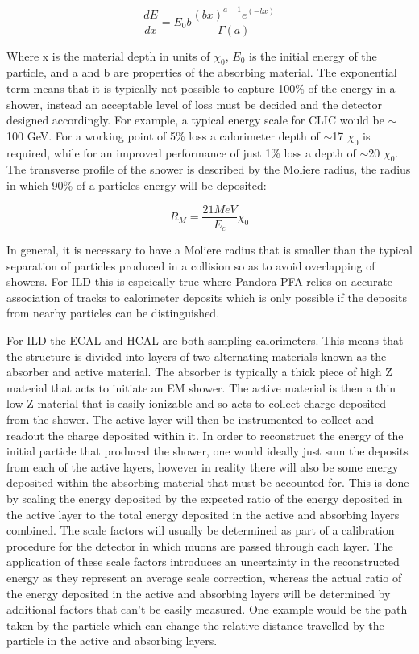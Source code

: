 \begin{equation}
  \label{bethebloch}
\frac{dE}{dx}=E_0 b \frac{(bx)^{a-1}e^(-bx)}{\Gamma(a)}
\end{equation}

Where x is the material depth in units of $\chi_0$, $E_0$ is the initial energy of the particle, and a and b are properties of the absorbing material. The exponential term means that it is typically not possible to capture 100\% of the energy in a shower, instead an acceptable level of loss must be decided and the detector designed accordingly. For example, a typical energy scale for \ac{CLIC} would be $\sim$ 100 GeV. For a working point of 5\% loss a calorimeter depth of $\sim$17 $\chi_0$ is required, while for an improved performance of just 1\% loss a depth of $\sim$20 $\chi_0$. The transverse profile of the shower is described by the Moliere radius, the radius in which 90\% of a particles energy will be deposited:

\begin{equation}
R_M=\frac{21MeV}{E_c}\chi_0
\end{equation}

In general, it is necessary to have a Moliere radius that is smaller than the typical separation of particles produced in a collision so as to avoid overlapping of showers. For \ac{ILD} this is espeically true where Pandora \ac{PFA} relies on accurate association of tracks to calorimeter deposits which is only possible if the deposits from nearby particles can be distinguished.

For \ac{ILD} the \ac{ECAL} and \ac{HCAL} are both sampling calorimeters. This means that the structure is divided into layers of two alternating materials known as the absorber and active material. The absorber is typically a thick piece of high Z material that acts to initiate an \ac{EM} shower. The active material is then a thin low Z material that is easily ionizable and so acts to collect charge deposited from the shower. The active layer will then be instrumented to collect and readout the charge deposited within it. In order to reconstruct the energy of the initial particle that produced the shower, one would ideally just sum the deposits from each of the active layers, however in reality there will also be some energy deposited within the absorbing material that must be accounted for. This is done by scaling the energy deposited by the expected ratio of the energy deposited in the active layer to the total energy deposited in the active and absorbing layers combined. The scale factors will usually be determined as part of a calibration procedure for the detector in which muons are passed through each layer. The application of these scale factors introduces an uncertainty in the reconstructed energy as they represent an average scale correction, whereas the actual ratio of the energy deposited in the active and absorbing layers will be determined by additional factors that can't be easily measured. One example would be the path taken by the particle which can change the relative distance travelled by the particle in the active and absorbing layers.

